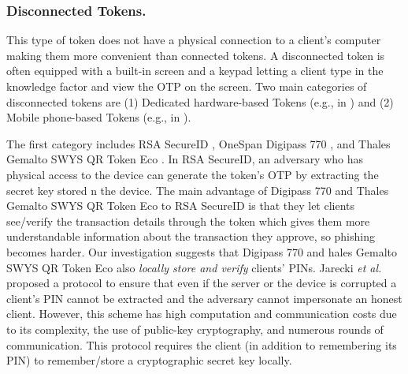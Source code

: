 



\vspace{-3mm}
\subsubsection{Disconnected Tokens.}

This type of token does not have a physical connection to a client's computer making them more convenient than connected tokens. A disconnected token is often equipped with a built-in screen and a keypad letting a client type in the knowledge factor and view the OTP on the screen.  Two main categories of disconnected tokens are (1) Dedicated hardware-based Tokens (e.g., in \cite{secureID,Digipass-website,Gemalto}) and (2) Mobile phone-based Tokens (e.g., in \cite{SARA22,KoganMB17,KonothFFARB20}). 

The first category includes RSA SecureID \cite{secureID}, OneSpan Digipass 770 \cite{Digipass-website}, and Thales Gemalto SWYS QR Token Eco \cite{Gemalto}. In RSA SecureID, an adversary who has physical access to the device can generate the token's OTP by extracting the secret key stored n the device.  The main advantage of  Digipass 770 and Thales Gemalto SWYS QR Token Eco to RSA SecureID is that they let clients see/verify the transaction details through the token which gives them more understandable information about the transaction they approve, so phishing becomes harder. 
%
Our investigation suggests that Digipass 770 and hales Gemalto SWYS QR Token Eco also \emph{locally store and verify} clients' PINs. Jarecki \textit{et al.} \cite{JareckiJKSS21} proposed a protocol to ensure that even if the server or the device is corrupted a client's PIN cannot be extracted and the adversary cannot impersonate an honest client. However, this scheme has high computation and communication costs due to its complexity,  the use of public-key cryptography, and numerous rounds of communication. This protocol requires the client (in addition to remembering its PIN) to remember/store a cryptographic secret key locally. 







